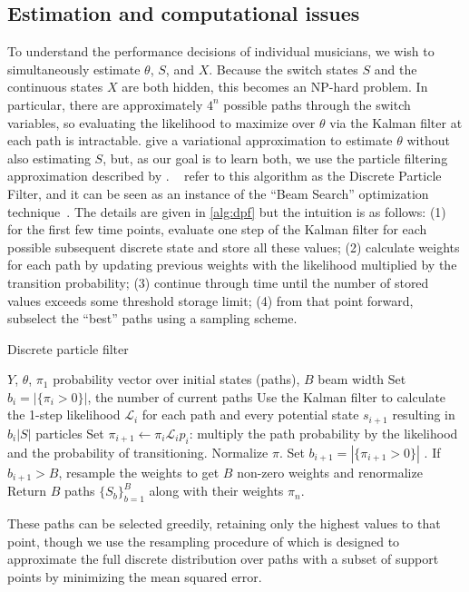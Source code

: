 \documentclass[aoas]{imsart}
\begin{document}
\subsection{Estimation and computational issues}
\label{sec:computational-issues}

To understand the performance decisions of individual musicians, we
wish to simultaneously estimate $\theta$, $S$, and $X$. Because the
switch states $S$ and the continuous states $X$ are both hidden, this becomes
an NP-hard problem. In particular, there are approximately $4^n$ possible paths
through the switch variables, so evaluating the likelihood to maximize
over $\theta$ via the Kalman filter at each path is intractable. 
\citet{GhahramaniHinton2000} give a variational approximation to
estimate $\theta$ without also estimating $S$, but, as our goal is to
learn both, we use the particle filtering approximation described by
\citet{FearnheadClifford2003}. ~\cite{WhiteleyAndrieu2010} refer to
this algorithm as the Discrete Particle Filter, and it can be seen as
an instance of the ``Beam Search'' optimization
technique~\citep{Bisiani1992}. The details are given in
\autoref{alg:dpf} but the intuition is as follows: (1) for the first
few time points, evaluate
one step of the Kalman filter for each possible subsequent discrete
state and store all these values; (2) calculate weights for each path
by updating previous weights with the likelihood multiplied by the transition probability;
(3) continue through time until the number of stored values exceeds
some threshold storage limit; (4) from that point forward, subselect
the ``best'' paths using a sampling scheme.
\begin{algorithm}[t!]
  \caption{Discrete particle filter\label{alg:dpf}}
  \begin{algorithmic}[1]
  $Y$, $\theta$, $\pi_1$ probability vector over initial states
  (paths), $B$ beam width
  \STATE Set $b_i=|\{\pi_i>0\}|$, the number of current paths
  \STATE Use %
  the Kalman filter to calculate the 1-step likelihood
  $\mathcal{L}_i$ for each path and every potential state $s_{i+1}$ resulting in $b_i|S|$ particles
  \STATE Set $\pi_{i+1} \leftarrow \pi_i\mathcal{L}_i p_i$: multiply the path
  probability by the likelihood and the probability of
  transitioning. Normalize $\pi$.
  \STATE Set $b_{i+1}=|\{\pi_{i+1}>0\}|$ . If $b_{i+1} > B$, resample the
  weights to get $B$ non-zero weights and renormalize
  \ENDFOR
  \STATE Return $B$ paths $\{S_b\}_{b=1}^B$ along with their weights $\pi_{n}$.
\end{algorithmic}
\end{algorithm}
These paths can be
selected greedily, retaining only the highest values to that point,
though we use the resampling procedure of
\citet{FearnheadClifford2003} which is designed to 
approximate the full discrete distribution over paths with a subset
of support points by minimizing the mean squared
error.
\end{document}
